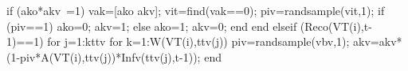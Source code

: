                                                                             if (ako*akv~=1)                                                                
                                                                                     vak=[ako akv];
                                                                                     vit=find(vak==0); 
                                                                                     piv=randsample(vit,1);
                                                                                     if (piv==1)
                                                                                            ako=0;
                                                                                            akv=1;        
                                                                                     else 
                                                                                            ako=1;
                                                                                            akv=0;                                                                                                                                                                               
                                                                                     end                                                                       
                                                                            end
                                                            elseif (Reco(VT(i),t-1)==1)
                                                                        for j=1:kttv                                                                                                  
                                                                                for k=1:W(VT(i),ttv(j))                                                                                                                                                                                                       
                                                                                        piv=randsample(vbv,1);                                   
                                                                                        akv=akv*(1-piv*A(VT(i),ttv(j))*Infv(ttv(j),t-1));                                                                                     
                                                                                end
                                                          
